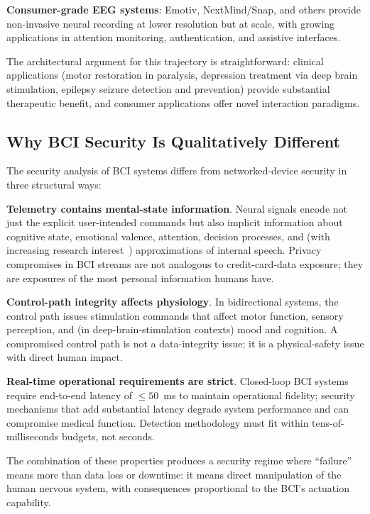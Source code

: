 \documentclass[sigconf,nonacm]{acmart}
\begin{document}
\textbf{Consumer-grade EEG systems}: Emotiv, NextMind/Snap, and
others provide non-invasive neural recording at lower resolution
but at scale, with growing applications in attention monitoring,
authentication, and assistive interfaces.

The architectural argument for this trajectory is straightforward:
clinical applications (motor restoration in paralysis, depression
treatment via deep brain stimulation, epilepsy seizure detection
and prevention) provide substantial therapeutic benefit, and
consumer applications offer novel interaction paradigms.

\subsection{Why BCI Security Is Qualitatively Different}

The security analysis of BCI systems differs from networked-device
security in three structural ways:

\textbf{Telemetry contains mental-state information}. Neural
signals encode not just the explicit user-intended commands but
also implicit information about cognitive state, emotional
valence, attention, decision processes, and (with increasing
research interest~\cite{anumanchipalli2024neural}) approximations
of internal speech. Privacy compromises in BCI streams are not
analogous to credit-card-data exposure; they are exposures of
the most personal information humans have.

\textbf{Control-path integrity affects physiology}. In bidirectional
systems, the control path issues stimulation commands that affect
motor function, sensory perception, and (in deep-brain-stimulation
contexts) mood and cognition. A compromised control path is not a
data-integrity issue; it is a physical-safety issue with direct
human impact.

\textbf{Real-time operational requirements are strict}. Closed-loop
BCI systems require end-to-end latency of $\leq 50$~ms to maintain
operational fidelity; security mechanisms that add substantial
latency degrade system performance and can compromise medical
function. Detection methodology must fit within tens-of-milliseconds
budgets, not seconds.

The combination of these properties produces a security regime where
``failure'' means more than data loss or downtime: it means direct
manipulation of the human nervous system, with consequences
proportional to the BCI's actuation capability.
\end{document}
